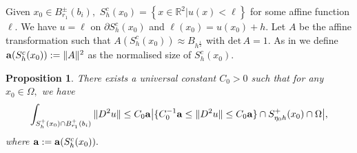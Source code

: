 \documentclass[11pt]{amsart}
\theoremstyle{plain}
\newtheorem{proposition}{Proposition}[section]
\renewcommand{\det}{\mbox{det}}
\newcommand{\0}{\textbf{0}}
\numberwithin{equation}{section}
\numberwithin{equation}{section}
\numberwithin{figure}{section}
\begin{document}
	Given $x_0\in B^{\pm}_{r_1}(b_i),$  $S^c_h(x_0)=\left\{x\in \mathbb{R}^2|u(x)<\ell\right\}$ for some affine function $\ell.$ 
	We have $u=\ell$ on $\partial S^c_h(x_0)$ and $\ell(x_0)=u(x_0)+h.$
	Let $A$ be the affine transformation such that $A\left(S^c_h(x_0)\right)\approx B_{h^{\frac{1}{2}}}$ with $\det\, A=1.$ As in \cite{DFS} we define ${\bf a}(S^c_h(x_0)):=\|A\|^2$ as the normalised size of $S^c_h(x_0).$ 
	
	\begin{proposition}\label{decay} 
		There exists a universal constant $C_0>0$ such that
		for any $x_0\in \Omega,$ we have
		\begin{equation}\label{decay1}
			\int_{S^+_h(x_0)\cap B^{+}_{r_1}(b_i)}\|D^2u\|\leq C_0{\bf a} \big|\{C_0^{-1}{\bf a}\leq \|D^2u\|\leq C_0{\bf a}\}\cap S^+_{\eta_0 h}(x_0)\cap\Omega\big|,
		\end{equation}
		where ${\bf a}:={\bf a}(S^c_h(x_0)).$
	\end{proposition}
	
\end{document}
